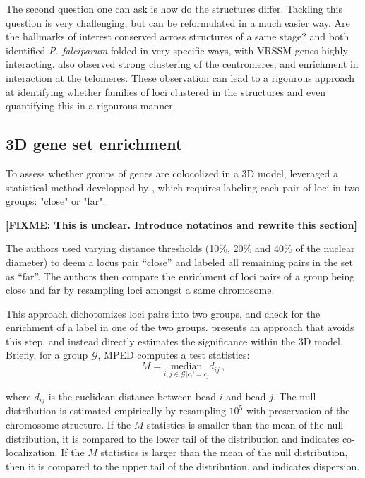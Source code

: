 \documentclass[letterpaper,12pt]{article}
\newcommand{\fixme}[1]{\textbf{[FIXME: #1]}}
\begin{document}
The second question one can ask is how do the structures differ. Tackling this
question is very challenging, but can be reformulated in a much easier way.
Are the hallmarks of interest conserved across structures of a same stage?
\citet{ay:three-dimensional} and \citet{lemieux:genome-wide} both identified
{\em P. falciparum} folded in very specific ways, with VRSSM genes highly
interacting. \citet{ay:three-dimensional} also observed strong clustering of
the centromeres, and enrichment in interaction at the telomeres. These
observation can lead to a rigourous approach at identifying whether families
of loci clustered in the structures and even quantifying this in a rigourous
manner.

\subsection*{3D gene set enrichment}

To assess whether groups of genes are colocolized in a 3D model,
\citet{ay:three-dimensional} leveraged a statistical method developped by
\citet{witten:assessment}, which requires labeling each pair of loci in two groups:
"close" or "far". 

\fixme{This is unclear. Introduce notatinos and rewrite this section}

The authors used varying distance
thresholds (10\%, 20\% and 40\% of the nuclear diameter) to deem a locus pair
“close” and labeled all remaining
pairs in the set as “far”.  The authors then compare the enrichment of loci
pairs of a group being close and far by resampling loci amongst a same
chromosome.

This approach dichotomizes loci pairs into two groups, and check for the
enrichment of a label in one of the two groups. \citep{capurso:distance-based}
presents an approach that avoids this step, and instead directly estimates the
significance within the 3D model. Briefly, for a group $\mathcal{G}$, MPED
computes a test statistics:
\begin{equation*}
M = \underset{i,j \in \mathcal{G}| c_i != c_j}{\text{median}} d_{ij}\,,
\end{equation*}

where $d_{ij}$ is the euclidean distance between bead $i$ and bead $j$. The
null distribution is estimated empirically by resampling $10^5$ with
preservation of the chromosome structure. If the $M$ statistics is smaller
than the mean of the null distribution, it is compared to the lower tail of
the distribution and indicates co-localization. If the $M$ statistics is
larger than the mean of the null distribution, then it is compared to the
upper tail of the distribution, and indicates dispersion.
\end{document}
